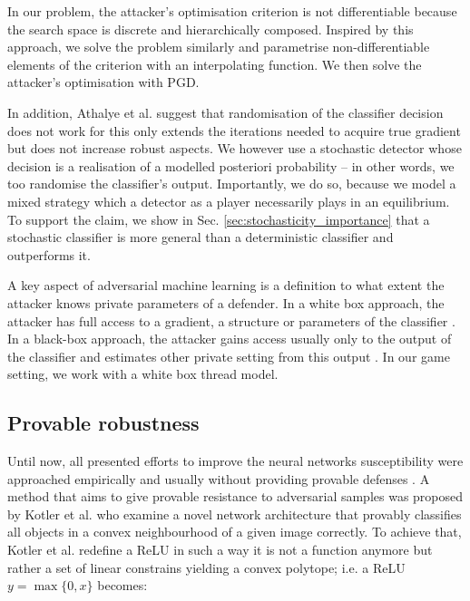 In our problem, the attacker's optimisation criterion is not differentiable because the search space is discrete and hierarchically composed. Inspired by this approach, we solve the problem similarly and parametrise non-differentiable elements of the criterion with an interpolating function. We then solve the attacker's optimisation with PGD.

In addition, Athalye et al. \cite{obfuscated_gradients} suggest that randomisation of the classifier decision does not work for this only extends the iterations needed to acquire true gradient but does not increase robust aspects. We however use a stochastic detector whose decision is a realisation of a modelled posteriori probability – in other words, we too randomise the classifier's output. Importantly, we do so, because we model a mixed strategy which a detector as a player necessarily plays in an equilibrium. To support the claim, we show in Sec. \ref{sec:stochasticity_importance} that a stochastic classifier is more general than a deterministic classifier and outperforms it.

A key aspect of adversarial machine learning is a definition to what extent the attacker knows private parameters of a defender. In a white box approach, the attacker has full access to a gradient, a structure or parameters of the classifier \cite{obfuscated_gradients, provable_defenses, stackelberg_games, barreno}. In a black-box approach, the attacker gains access usually only to the output of the classifier and estimates other private setting from this output \cite{black-box, black_box_adversarial_attacks}. In our game setting, we work with a white box thread model.

\subsection{Provable robustness}

Until now, all presented efforts to improve the neural networks
susceptibility were approached empirically and usually without providing
provable defenses \cite{towards_deep_learning_models}. A method that aims to give provable
resistance to adversarial samples was proposed by Kotler et al. \cite{provable_defenses} who
examine a novel network architecture that provably classifies all
objects in a convex neighbourhood of a given image correctly. To achieve
that, Kotler et al. \cite{provable_defenses} redefine a ReLU \cite{relu} in such a way it
is not a function anymore but rather a set of linear constrains yielding
a convex polytope; i.e. a ReLU $y = \max \{0, x\}$ becomes:

